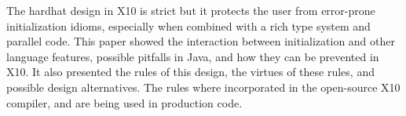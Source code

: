 The hardhat design in X10 is strict but it protects the user from
    error-prone initialization idioms,
    especially when combined with a rich type system and parallel code.
This paper showed the interaction between initialization and other language features,
    possible pitfalls in Java,
    and how they can be prevented in X10.
It also presented the rules of this design,
    the virtues of these rules,
    and possible design alternatives.
The rules where incorporated in the open-source X10 compiler,
    and are being used in production code.
